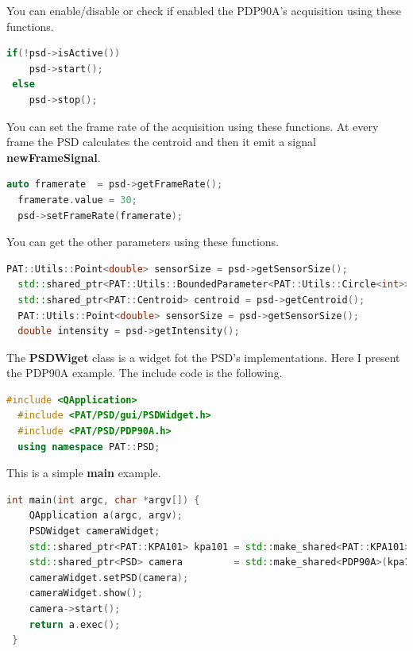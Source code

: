 You can enable/disable or check if enabled the PDP90A's acquisition
using these functions.

\begin{lstlisting}[language=c++, gobble=2]
  if(!psd->isActive())
    psd->start();
 else
    psd->stop();
\end{lstlisting}

You can set the frame rate of the acquisition using these functions. At
every frame the PSD calculates the centroid and then it emit a signal
\textbf{newFrameSignal}.

\begin{lstlisting}[language=c++, gobble=2]
  auto framerate  = psd->getFrameRate();
  framerate.value = 30;
  psd->setFrameRate(framerate);
\end{lstlisting}

You can get the other parameters using these functions.

\begin{lstlisting}[language=c++, gobble=2]
  PAT::Utils::Point<double> sensorSize = psd->getSensorSize();
  std::shared_ptr<PAT::Utils::BoundedParameter<PAT::Utils::Circle<int>>> target = psd->getTarget();
  std::shared_ptr<PAT::Centroid> centroid = psd->getCentroid();
  PAT::Utils::Point<double> sensorSize = psd->getSensorSize();
  double intensity = psd->getIntensity();
\end{lstlisting}


The \textbf{PSDWiget} class is a widget fot the PSD's implementations.
Here I present the PDP90A example. The include code is the following.

\begin{lstlisting}[language=c++, gobble=2]
  #include <QApplication>
  #include <PAT/PSD/gui/PSDWidget.h>
  #include <PAT/PSD/PDP90A.h>
  using namespace PAT::PSD;
\end{lstlisting}

This is a simple \textbf{main} example.

\begin{lstlisting}[language=c++, gobble=2]
  int main(int argc, char *argv[]) {
    QApplication a(argc, argv);
    PSDWidget cameraWidget;
    std::shared_ptr<PAT::KPA101> kpa101 = std::make_shared<PAT::KPA101>();
    std::shared_ptr<PSD> camera         = std::make_shared<PDP90A>(kpa101);
    cameraWidget.setPSD(camera);
    cameraWidget.show();
    camera->start();
    return a.exec();
 }
\end{lstlisting}


